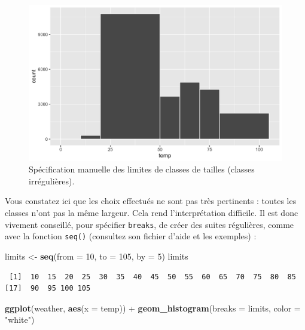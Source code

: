 \documentclass[
  a4paper,
]{article}
\newenvironment{Shaded}{\begin{snugshade}}{\end{snugshade}}
\newcommand{\DataTypeTok}[1]{\textcolor[rgb]{0.00,0.34,0.68}{#1}}
\newcommand{\DecValTok}[1]{\textcolor[rgb]{0.69,0.50,0.00}{#1}}
\newcommand{\KeywordTok}[1]{\textcolor[rgb]{0.12,0.11,0.11}{\textbf{#1}}}
\newcommand{\NormalTok}[1]{\textcolor[rgb]{0.12,0.11,0.11}{#1}}
\newcommand{\OperatorTok}[1]{\textcolor[rgb]{0.12,0.11,0.11}{#1}}
\newcommand{\StringTok}[1]{\textcolor[rgb]{0.75,0.01,0.01}{#1}}
\begin{document}
\begin{figure}[htpb]

{\centering \includegraphics[width=0.9\linewidth]{figure/irregclasses-1} 

}

\caption{Spécification manuelle des limites de classes de tailles (classes irrégulières).}\label{fig:irregclasses}
\end{figure}

Vous constatez ici que les choix effectués ne sont pas très pertinents : toutes les classes n'ont pas la même largeur. Cela rend l'interprétation difficile. Il est donc vivement conseillé, pour spécifier \texttt{breaks}, de créer des suites régulières, comme avec la fonction \texttt{seq()} (consultez son fichier d'aide et les exemples) :

\begin{Shaded}
\begin{Highlighting}[]
\NormalTok{limits <-}\StringTok{ }\KeywordTok{seq}\NormalTok{(}\DataTypeTok{from =} \DecValTok{10}\NormalTok{, }\DataTypeTok{to =} \DecValTok{105}\NormalTok{, }\DataTypeTok{by =} \DecValTok{5}\NormalTok{)}
\NormalTok{limits}
\end{Highlighting}
\end{Shaded}

\begin{verbatim}
 [1]  10  15  20  25  30  35  40  45  50  55  60  65  70  75  80  85
[17]  90  95 100 105
\end{verbatim}

\begin{Shaded}
\begin{Highlighting}[]
\KeywordTok{ggplot}\NormalTok{(weather, }\KeywordTok{aes}\NormalTok{(}\DataTypeTok{x =}\NormalTok{ temp)) }\OperatorTok{+}
\StringTok{  }\KeywordTok{geom_histogram}\NormalTok{(}\DataTypeTok{breaks =}\NormalTok{ limits, }\DataTypeTok{color =} \StringTok{"white"}\NormalTok{)}
\end{Highlighting}
\end{Shaded}
\end{document}
